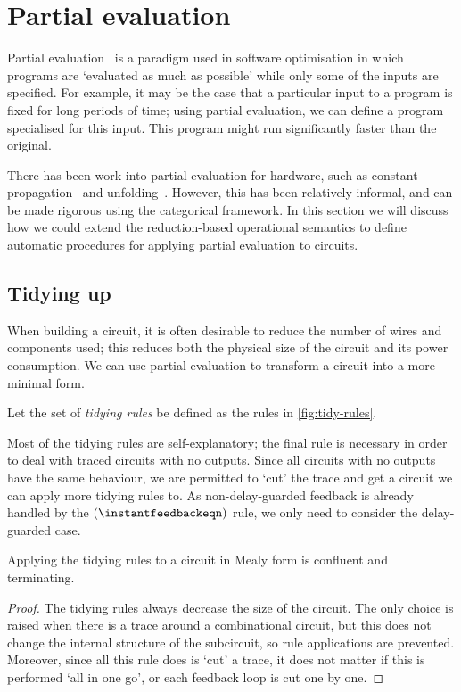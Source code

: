 \section{Partial evaluation}

Partial evaluation~\cite{jones1996introduction} is a paradigm used in software
optimisation in which programs are `evaluated as much as possible' while only
some of the inputs are specified.
For example, it may be the case that a particular input to a program is fixed
for long periods of time; using partial evaluation, we can define a program
specialised for this input.
This program might run significantly faster than the original.

There has been work into partial evaluation for hardware, such as constant
propagation~\cite{singh1996expressing,singh1999partial} and
unfolding~\cite{thompson2006bitlevel}.
However, this has been relatively informal, and can be made rigorous using the
categorical framework.
In this section we will discuss how we could extend the reduction-based
operational semantics to define automatic procedures for applying partial
evaluation to circuits.

\subsection{Tidying up}

When building a circuit, it is often desirable to reduce the number of wires
and components used; this reduces both the physical size of the circuit and its
power consumption.
We can use partial evaluation to transform a circuit into a more minimal form.

\begin{definition}
    Let the set of \emph{tidying rules} be defined as the rules in
    \cref{fig:tidy-rules}.
\end{definition}

Most of the tidying rules are self-explanatory; the final rule is necessary in
order to deal with traced circuits with no outputs.
Since all circuits with no outputs have the same behaviour, we are permitted to
`cut' the trace and get a circuit we can apply more tidying rules to.
As non-delay-guarded feedback is already handled by the
\((\instantfeedbackeqn)\) rule, we only need to consider the delay-guarded case.



\begin{proposition}
    Applying the tidying rules to a circuit in Mealy form is confluent and
    terminating.
\end{proposition}
\begin{proof}
    The tidying rules always decrease the size of the circuit.
    The only choice is raised when there is a trace around a combinational
    circuit, but this does not change the internal structure of the subcircuit,
    so rule applications are prevented.
    Moreover, since all this rule does is `cut' a trace, it does not matter if
    this is performed `all in one go', or each feedback loop is cut one by one.
\end{proof}

